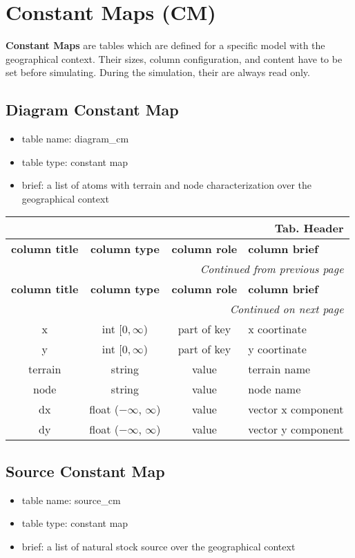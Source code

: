 \documentclass[a4paper,oneside,titlepage]{report}
\newcommand*{\LTHeaderIV}[5]{
  \multicolumn{4}{r}{\textbf{Tab. \thesubsection} \textbf{#1}}\\    
  \hline
  \textbf{#2} & \textbf{#3} & \textbf{#4} & \textbf{#5}\\
  \hline
  
  \endfirsthead
  \multicolumn{4}{r}{\textit{Continued from previous page}}\\    
  \hline
  \textbf{#2} & \textbf{#3} & \textbf{#4} & \textbf{#5}\\
  \hline
  \endhead
  \hline
  \multicolumn{4}{r}{\textit{Continued on next page}}\\
  \endfoot
  \hline
  \endlastfoot  
}
\begin{document}
\section{Constant Maps (CM)}
\textbf{Constant Maps} are tables which are defined for a specific model with the geographical context. Their sizes, column configuration, and content have to be set before simulating. During the simulation, their are always read only.

\subsection{Diagram Constant Map}
\begin{itemize}
  \setlength{\itemsep}{0pt}
  \setlength{\parskip}{0pt}
\item table name: diagram\_cm  
\item table type: constant map  
\item brief: a list of atoms with terrain and node characterization over the geographical context
\end{itemize}

\begin{longtable}{ |c|c|c|l| } 
  \LTHeaderIV{Header}{column title}{column type}{column role}{column brief}                    
  x & int $[0, \infty$) & part of key & x coortinate\\
  y & int $[0, \infty$) & part of key & y coortinate\\
  terrain & string & value & terrain name\\
  node & string & value & node name\\
  dx & float ($-\infty$, $\infty$) & value & vector x component\\
  dy & float ($-\infty$, $\infty$) & value & vector y component\\
\end{longtable}        

\subsection{Source Constant Map}
\begin{itemize}
  \setlength{\itemsep}{0pt}
  \setlength{\parskip}{0pt}
\item table name: source\_cm  
\item table type: constant map  
\item brief: a list of natural stock source over the geographical context
\end{itemize}
\end{document}
